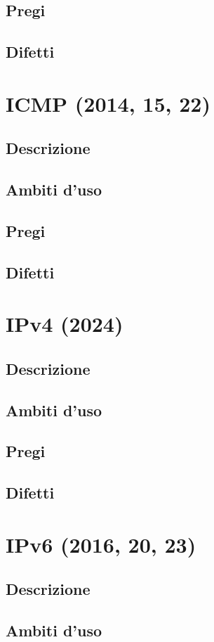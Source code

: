 \documentclass[10pt,oneside,a4paper]{article}
\begin{document}
\subsection{Pregi}
\subsection{Difetti}
\section{ICMP (2014, 15, 22)}
\subsection{Descrizione}
\subsection{Ambiti d'uso}
\subsection{Pregi}
\subsection{Difetti}
\section{IPv4 (2024)}
\subsection{Descrizione}
\subsection{Ambiti d'uso}
\subsection{Pregi}
\subsection{Difetti}
\section{IPv6 (2016, 20, 23)}
\subsection{Descrizione}
\subsection{Ambiti d'uso}
\end{document}
